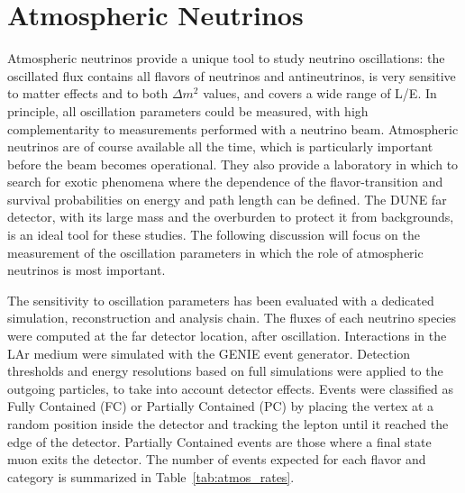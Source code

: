 \section{Atmospheric Neutrinos}
\label{sec:physics-atmpdk-atmnu}

Atmospheric neutrinos %
provide a unique tool to study neutrino oscillations: the 
oscillated flux contains all flavors of neutrinos and antineutrinos, is very sensitive to 
matter effects and to both $\Delta m^2$ values, %
and covers a wide range of L/E. In principle, 
all oscillation parameters could be measured, with high complementarity to 
measurements performed with a neutrino beam. %
Atmospheric 
neutrinos are of course available all the time, %
which is particularly important before the beam becomes 
operational. %
They also provide a laboratory in which to search 
for exotic phenomena where the dependence of the flavor-transition and survival 
probabilities on energy and path length can be defined. The DUNE far detector, 
with its large mass and the overburden to protect it from backgrounds, is an 
ideal tool for these studies. The following discussion will focus on the 
measurement of the oscillation parameters in which the role of atmospheric neutrinos is 
most important. 

The sensitivity to oscillation parameters has been evaluated with a 
dedicated simulation, reconstruction and analysis chain. 
The fluxes of each neutrino species were computed at the far detector location, after 
oscillation. Interactions in the LAr medium were simulated with the GENIE event 
generator. Detection thresholds and energy resolutions based on full 
simulations were applied to the outgoing particles, to take into account 
detector effects. Events were classified as Fully Contained (FC) or 
Partially Contained (PC) by placing the vertex at a random position inside the 
detector and tracking the lepton until it reached the edge of the detector. %
Partially Contained events 
are those where a final state muon exits the detector.  The number of events expected 
for each flavor and category is summarized in Table~\ref{tab:atmos_rates}.

